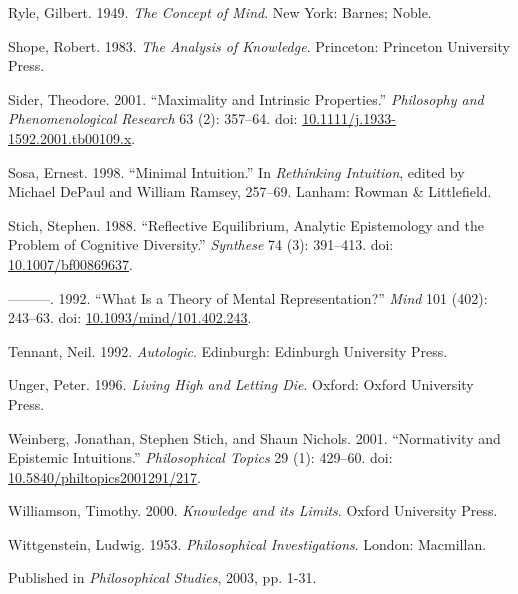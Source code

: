 \documentclass[
  11pt,
  letterpaper,
  DIV=11,
  numbers=noendperiod,
  twoside]{scrartcl}
\newlength{\cslhangindent}
\newenvironment{CSLReferences}[2] %
 {\begin{list}{}{%
  \setlength{\itemindent}{0pt}
  \setlength{\leftmargin}{0pt}
  \setlength{\parsep}{0pt}
  \ifodd #1
   \setlength{\leftmargin}{\cslhangindent}
   \setlength{\itemindent}{-1\cslhangindent}
  \fi
  \setlength{\itemsep}{#2\baselineskip}}}
 {\end{list}}
\begin{document}
\begin{CSLReferences}{1}{0}
Ryle, Gilbert. 1949. \emph{The Concept of Mind}. New York: Barnes;
Noble.

Shope, Robert. 1983. \emph{The Analysis of Knowledge}. Princeton:
Princeton University Press.

Sider, Theodore. 2001. {``{Maximality and Intrinsic Properties}.''}
\emph{Philosophy and Phenomenological Research} 63 (2): 357--64. doi:
\href{https://doi.org/10.1111/j.1933-1592.2001.tb00109.x}{10.1111/j.1933-1592.2001.tb00109.x}.

Sosa, Ernest. 1998. {``Minimal Intuition.''} In \emph{Rethinking
Intuition}, edited by Michael DePaul and William Ramsey, 257--69.
Lanham: Rowman \& Littlefield.

Stich, Stephen. 1988. {``Reflective Equilibrium, Analytic Epistemology
and the Problem of Cognitive Diversity.''} \emph{Synthese} 74 (3):
391--413. doi:
\href{https://doi.org/10.1007/bf00869637}{10.1007/bf00869637}.

---------. 1992. {``What Is a Theory of Mental Representation?''}
\emph{Mind} 101 (402): 243--63. doi:
\href{https://doi.org/10.1093/mind/101.402.243}{10.1093/mind/101.402.243}.

Tennant, Neil. 1992. \emph{Autologic}. Edinburgh: Edinburgh University
Press.

Unger, Peter. 1996. \emph{Living High and Letting Die}. Oxford: Oxford
University Press.

Weinberg, Jonathan, Stephen Stich, and Shaun Nichols. 2001.
{``Normativity and Epistemic Intuitions.''} \emph{Philosophical Topics}
29 (1): 429--60. doi:
\href{https://doi.org/10.5840/philtopics2001291/217}{10.5840/philtopics2001291/217}.

Williamson, Timothy. 2000. \emph{{Knowledge and its Limits}}. Oxford
University Press.

Wittgenstein, Ludwig. 1953. \emph{Philosophical Investigations}. London:
Macmillan.

\end{CSLReferences}



\noindent Published in\emph{
Philosophical Studies}, 2003, pp. 1-31.
\end{document}
